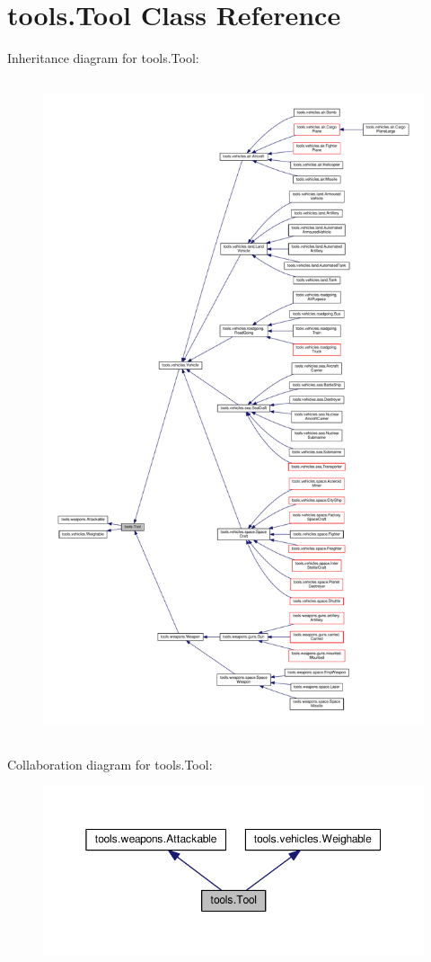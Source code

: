 \hypertarget{classtools_1_1_tool}{}\section{tools.\+Tool Class Reference}
\label{classtools_1_1_tool}


Inheritance diagram for tools.\+Tool\+:
\nopagebreak
\begin{figure}[H]
\begin{center}
\leavevmode
\includegraphics[height=550pt]{classtools_1_1_tool__inherit__graph}
\end{center}
\end{figure}


Collaboration diagram for tools.\+Tool\+:
\nopagebreak
\begin{figure}[H]
\begin{center}
\leavevmode
\includegraphics[width=350pt]{classtools_1_1_tool__coll__graph}
\end{center}
\end{figure}
